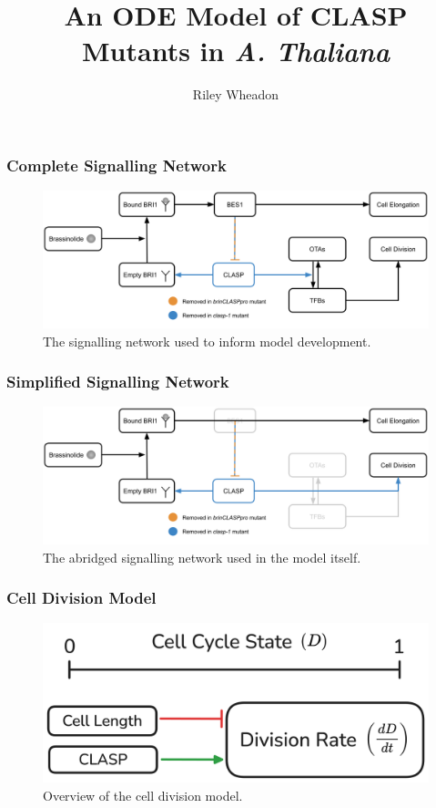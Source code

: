 \documentclass{beamer}
\title{An ODE Model of CLASP Mutants in \emph{A. Thaliana}}
\author{Riley Wheadon}
\institute{University of British Columbia}
\begin{document}
\begin{frame}
\frametitle{Complete Signalling Network}
\begin{figure}
  \centering
  \includegraphics[width=\textwidth]{network-complete.png}
  \caption{The signalling network used to inform model development.}
\end{figure}
\end{frame}

\begin{frame}
\frametitle{Simplified Signalling Network}
\begin{figure}
  \centering
  \includegraphics[width=\textwidth]{network-simplified.png}
  \caption{The abridged signalling network used in the model itself.}
\end{figure}
\end{frame}

\begin{frame}
\frametitle{Cell Division Model}
\begin{figure}
  \centering
  \includegraphics[width=\textwidth]{division-model.png}
  \caption{Overview of the cell division model.}
\end{figure}
\end{frame}
\end{document}
